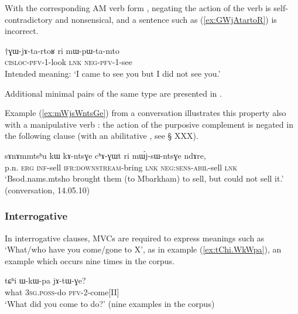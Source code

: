 With the corresponding AM verb form , negating the action of the verb is self-contradictory and nonsensical, and a sentence such as (\ref{ex:GWjAtartoR}) is incorrect.

\begin{exe}
\ex \label{ex:GWjAtartoR}
\gll $\dagger$ɣɯ-jɤ-ta-rtoʁ ri mɯ-pɯ-ta-mto \\
\textsc{cisloc}-\textsc{pfv}-1-look \textsc{lnk} \textsc{neg}-\textsc{pfv}-1-see \\
\glt Intended meaning: `I came to see you but I did not see you.' 
\end{exe}

Additional minimal pairs of the same type are presented in \citet[202-203]{jacques13harmonization}.

Example (\ref{ex:mWjsWntsGe}) from a conversation illustrates this property also with a manipulative verb : the action of the purposive complement   is negated in the following clause (with an abilitative , see § XXX).

 \begin{exe}
\ex \label{ex:mWjsWntsGe}
 \gll   sɤnɤmmtsʰu kɯ kɤ-ntsɣe cʰɤ-ɣɯt ri mɯ́j-sɯ-ntsɣe ndɤre, \\
 p.n. \textsc{erg} \textsc{inf}-sell \textsc{ifr}:\textsc{downstream}-bring \textsc{lnk} \textsc{neg}:\textsc{sens}-\textsc{abil}-sell \textsc{lnk} \\
\glt `Bsod.nams.mtsho brought them (to Mbarkham) to sell, but could not sell it.' (conversation, 14.05.10)
 \end{exe}

 

\subsubsection{Interrogative} \label{sec:am.interrogative}
In interrogative clauses, MVCs are required to express meanings such as `What/who have you come/gone to X', as in example (\ref{ex:tChi.WkWpa}), an example which occurs nine times in the corpus.

\begin{exe}
\ex \label{ex:tChi.WkWpa}
\gll tɕʰi ɯ-kɯ-pa jɤ-tɯ-ɣe? \\
what \textsc{3sg.poss}-do \textsc{pfv}-2-come[II] \\
\glt `What did you come to do?' (nine examples in the corpus)
\end{exe}

